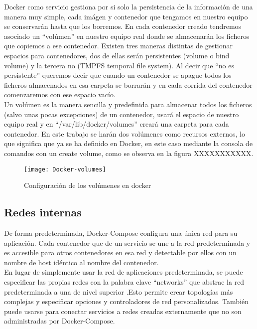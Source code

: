 \documentclass[ spanish, a4paper, 12pt, oneside]{report}
\begin{document}
Docker como servicio gestiona por si solo la persistencia de la información de una manera muy simple, cada imágen y contenedor que tengamos en nuestro equipo se conservarán hasta que los borremos. En cada contenedor creado tendremos asociado un ``volúmen'' en nuestro equipo real donde se almacenarán 
los ficheros que copiemos a ese contenedor. Existen tres maneras distintas de gestionar espacios para contenedores, dos de ellas serán persistentes (volume o bind volume) y la tercera no (TMPFS temporal file system). Al decir que ``no es persistente'' queremos decir que cuando un contenedor se apague todos los 
ficheros almacenados en esa carpeta se borrarán y en cada corrida del contenedor comenzaremos con ese espacio vacío. \\

Un volúmen es la manera sencilla y predefinida para almacenar todos los ficheros (salvo unas pocas excepciones) de un contenedor, usará el espacio de nuestro equipo real y en ``/var/lib/docker/volumes'' creará una carpeta para cada contenedor. En este trabajo se harán dos volúmenes como recursos externos, 
lo que significa que ya se ha definido en Docker, en este caso mediante la consola de comandos con un create volume, como se observa en la figura XXXXXXXXXXX.\\

\begin{figure}[!h]
   \centering
   \texttt{[image: Docker-volumes]}\\
      \caption{\label{fig: Configuración de los volúmenes en docker} Configuración de los volúmenes en docker}
\end{figure}

\subsection{Redes internas}
De forma predeterminada, Docker-Compose configura una única red para su aplicación. Cada contenedor que de un servicio se une a la red predeterminada y es accesible para otros contenedores en esa red y detectable por ellos con un nombre de host idéntico al nombre del contenedor.\\
En lugar de simplemente usar la red de aplicaciones predeterminada, se puede especificar las propias redes con la palabra clave ``networks'' que abstrae la red predeterminada a una de nivel superior .Esto permite crear topologías más complejas y especificar opciones y controladores de red personalizados. 
También puede usarse para conectar servicios a redes creadas externamente que no son administradas por Docker-Compose. \\
\end{document}
